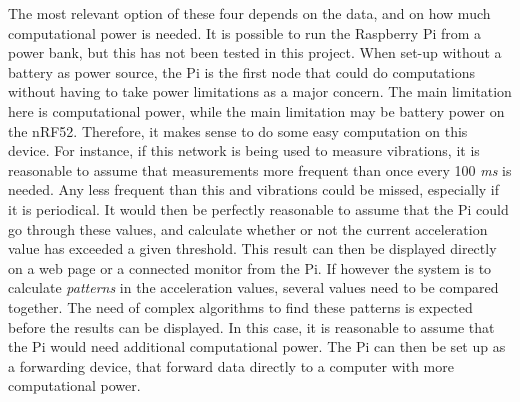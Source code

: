 \noindent The most relevant option of these four depends on the data, and on how much computational power is needed. It is possible to run the \gls{Raspberry Pi} from a power bank, but this has not been tested in this project. When set-up without a battery as power source, the Pi is the first node that could do computations without having to take power limitations as a major concern. The main limitation here is computational power, while the main limitation may be battery power on the \gls{nRF52}. Therefore, it makes sense to do some easy computation on this device. For instance, if this network is being used to measure vibrations, it is reasonable to assume that measurements more frequent than once every 100 \textit{ms} is needed. Any less frequent than this and vibrations could be missed, especially if it is periodical. It would then be perfectly reasonable to assume that the Pi could go through these values, and calculate whether or not the current acceleration value has exceeded a given threshold. This result can then be displayed directly on a web page or a connected monitor from the Pi. If however the system is to calculate \textit{patterns} in the acceleration values, several values need to be compared together. The need of complex algorithms to find these patterns is expected before the results can be displayed. In this case, it is reasonable to assume that the Pi would need additional computational power. The Pi can then be set up as a forwarding device, that forward data directly to a computer with more computational power. 









